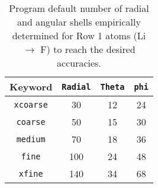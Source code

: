 

\begin{table}[h]
\begin{center}
\caption{Program default number of radial and angular shells empirically determined for Row 1 atoms
  (Li $\rightarrow$ F) to reach the desired accuracies.}

\vspace{.2in}

  \begin{tabular}[right]{|c|c|c|c|} \hline
Keyword & {\tt Radial} & {\tt Theta} & {\tt phi} \\ \hline
{\tt xcoarse} & 30 & 12 & 24  \\ \hline
{\tt coarse}  & 50 & 15 & 30  \\ \hline
{\tt medium}  & 70 & 18 & 36  \\ \hline
{\tt fine}    &100 & 24 & 48  \\ \hline
{\tt xfine}   &140 & 34 & 68  \\ \hline
  \end{tabular} \\
\end{center}
\end{table}


